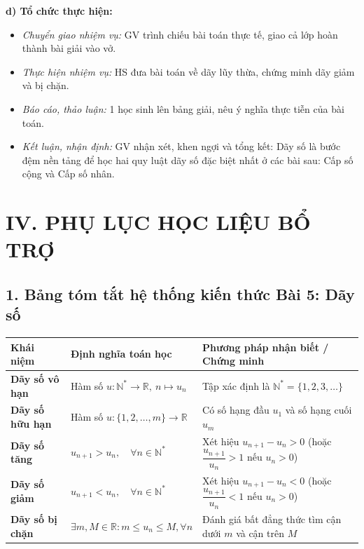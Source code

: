 \documentclass[12pt, a4paper]{article}
\begin{document}
\noindent \textbf{d) Tổ chức thực hiện:}  
\begin{itemize}[leftmargin=0.8cm]  
    \item \textit{Chuyển giao nhiệm vụ:} GV trình chiếu bài toán thực tế, giao cả lớp hoàn thành bài giải vào vở.  
    \item \textit{Thực hiện nhiệm vụ:} HS đưa bài toán về dãy lũy thừa, chứng minh dãy giảm và bị chặn.  
    \item \textit{Báo cáo, thảo luận:} 1 học sinh lên bảng giải, nêu ý nghĩa thực tiễn của bài toán.  
    \item \textit{Kết luận, nhận định:} GV nhận xét, khen ngợi và tổng kết: Dãy số là bước đệm nền tảng để học hai quy luật dãy số đặc biệt nhất ở các bài sau: Cấp số cộng và Cấp số nhân.  
\end{itemize}  
  
\section*{IV. PHỤ LỤC HỌC LIỆU BỔ TRỢ}  
  
\subsection*{1. Bảng tóm tắt hệ thống kiến thức Bài 5: Dãy số}  
  
\begin{center}  
\small  
\begin{tabularx}{\textwidth}{|p{3.2cm}|X|X|}  
\hline  
\textbf{Khái niệm} & \textbf{Định nghĩa toán học} & \textbf{Phương pháp nhận biết / Chứng minh} \\ \hline  
\textbf{Dãy số vô hạn} & Hàm số $u: \mathbb{N}^* \to \mathbb{R},\ n \mapsto u_n$ & Tập xác định là $\mathbb{N}^* = \{1, 2, 3, \dots\}$ \\ \hline  
\textbf{Dãy số hữu hạn} & Hàm số $u: \{1, 2, \dots, m\} \to \mathbb{R}$ & Có số hạng đầu $u_1$ và số hạng cuối $u_m$ \\ \hline  
\textbf{Dãy số tăng} & $u_{n+1} > u_n, \quad \forall n \in \mathbb{N}^*$ & Xét hiệu $u_{n+1} - u_n > 0$ (hoặc $\dfrac{u_{n+1}}{u_n} > 1$ nếu $u_n > 0$) \\ \hline  
\textbf{Dãy số giảm} & $u_{n+1} < u_n, \quad \forall n \in \mathbb{N}^*$ & Xét hiệu $u_{n+1} - u_n < 0$ (hoặc $\dfrac{u_{n+1}}{u_n} < 1$ nếu $u_n > 0$) \\ \hline  
\textbf{Dãy số bị chặn} & $\exists m, M \in \mathbb{R}: m \le u_n \le M, \forall n$ & Đánh giá bất đẳng thức tìm cận dưới $m$ và cận trên $M$ \\ \hline  
\end{tabularx}  
\end{center}  
  
\end{document}
